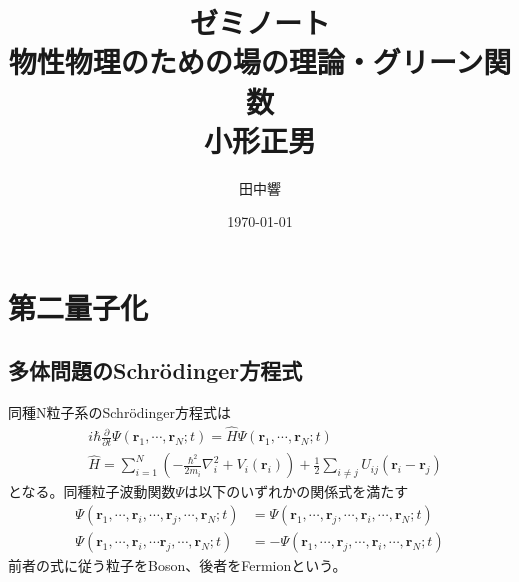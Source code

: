 \documentclass[dvipdfmx, 11pt, a4paper]{jsarticle}
\title{ゼミノート \\ \large 物性物理のための場の理論・グリーン関数 \\ 小形正男} %
\author{田中響}%
\date{\today}  %
\theoremstyle{definition}
\numberwithin{equation}{section}
\begin{document}
\maketitle %
\tableofcontents %

\maketitle

\newpage
\section{第二量子化}
\subsection{多体問題のSchrödinger方程式}
    同種N粒子系のSchrödinger方程式は
    \begin{align}
        &i\hbar \frac{\partial}{\partial t} \Psi(\bm{r}_1,\cdots,\bm{r}_N;t) = \hat{H} \Psi(\bm{r}_1,\cdots,\bm{r}_N;t) \label{NryuShiSyuredi}\\
        &\hat{H} = \sum_{i=1}^N \left( -\frac{\hbar^2}{2m_i} \nabla_i^2 + V_i(\bm{r}_i) \right) + \frac{1}{2}\sum_{i\ne j}U_{ij}(\bm{r}_i-\bm{r}_j)
    \end{align}
    となる。同種粒子波動関数$\Psi$は以下のいずれかの関係式を満たす
    \begin{align}
        \Psi(\bm{r}_1,\cdots, \bm{r}_i,\cdots, \bm{r}_j,\cdots,\bm{r}_N;t) &= \Psi(\bm{r}_1,\cdots, \bm{r}_j,\cdots, \bm{r}_i,\cdots,\bm{r}_N;t) \label{BoseTaisyouKansu} \\
        \Psi(\bm{r}_1,\cdots, \bm{r}_i,\cdots \bm{r}_j,\cdots,\bm{r}_N;t) &= -\Psi(\bm{r}_1,\cdots, \bm{r}_j,\cdots, \bm{r}_i,\cdots,\bm{r}_N;t)\label{FermiTaisyouKansu}
    \end{align}
    前者の式に従う粒子をBoson、後者をFermionという。
\end{document}
